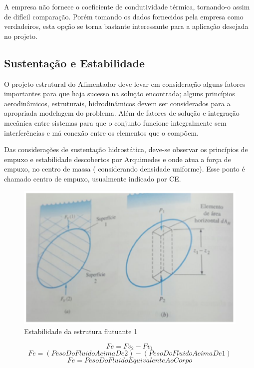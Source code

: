 A empresa não fornece o coeficiente de condutividade térmica, tornando-o assim de difícil comparação. Porém tomando os dados fornecidos pela empresa como verdadeiros, esta opção se torna bastante interessante para a aplicação desejada no projeto.

\subsection{Sustentação e Estabilidade}

O projeto estrutural do Alimentador deve levar em consideração alguns fatores importantes para que haja sucesso na solução encontrada; alguns princípios aerodinâmicos, estruturais, hidrodinâmicos devem ser considerados para a apropriada modelagem do problema. Além de fatores de solução e integração mecânica entre sistemas para que o conjunto funcione integralmente sem interferências e má conexão entre os elementos que o compõem.

Das considerações de sustentação hidrostática, deve-se observar os princípios de empuxo e estabilidade \cite{Frank} descobertos por Arquimedes e onde atua a força de empuxo, no centro de massa ( considerando densidade uniforme). Esse ponto é chamado centro de empuxo, usualmente indicado por CE.

\begin{figure}[H]
 \centering
   \includegraphics[keepaspectratio=true,scale=0.8]{figuras/circulos_1.eps}
 \caption{Estabilidade da estrutura flutuante 1}
 \label{estabilidade1}
\end{figure}

\[Fe = Fv_{2} -Fv_{1}\]
\[Fe = (PesoDoFluidoAcimaDe2) - (PesoDoFluidoAcimaDe1)\]
\[Fe = PesoDoFluidoEquivalenteAo Corpo\]


